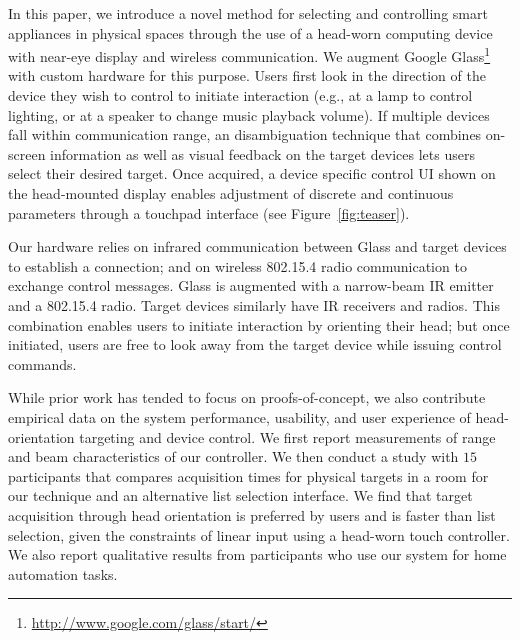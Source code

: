In this paper, we introduce a novel method for selecting and controlling smart appliances in physical spaces through the use of a head-worn computing device with near-eye display and wireless communication. We augment Google Glass\footnote{\url{http://www.google.com/glass/start/}} with custom hardware for this purpose. Users first look in the direction of the device they wish to control to initiate interaction (e.g., at a lamp to control lighting, or at a speaker to change music playback volume).  If multiple devices fall within communication range, an disambiguation technique that combines on-screen information as well as visual feedback on the target devices lets users select their desired target. Once acquired, a device specific control UI shown on the head-mounted display enables adjustment of discrete and continuous parameters through a touchpad interface (see Figure~\ref{fig:teaser}).

Our hardware relies on infrared communication between Glass and target devices to establish a connection; and on wireless 802.15.4 radio communication to exchange control messages.  Glass is augmented with a narrow-beam IR emitter and a 802.15.4 radio. Target devices similarly have IR receivers and radios. This combination enables users to initiate interaction by orienting their head; but once initiated, users are free to look away from the target device while issuing control commands.

While prior work has tended to focus on proofs-of-concept, we also contribute empirical data on the system performance, usability, and user experience of  head-orientation targeting and device control. We first report measurements of range and beam characteristics of our controller. We then conduct a study with $15$ participants that compares acquisition times for physical targets in a room for our technique and an alternative list selection interface. We find that target acquisition through head orientation is preferred by users and is faster than list selection, given the constraints of linear input using a head-worn touch controller. We also report qualitative results from participants who use our system for home automation tasks.






